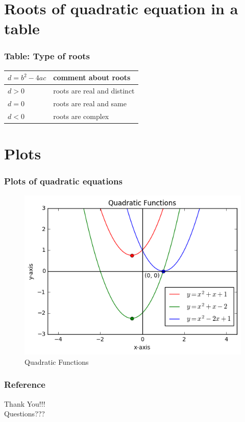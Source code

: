 \documentclass{beamer}
\begin{document}
\section{Roots of quadratic equation in a table}

\begin{frame}
  \frametitle{Table: Type of roots}\label{table-type-of-roots}
  \begin{center}
    \begin{tabular}{|l|l|}
      \hline
      $d = b^2-4ac$ & comment about roots\\
      \hline \hline
      $d>0$ & roots are real and distinct\\
      \hline
      $d = 0$ & roots are real and same\\
      \hline
      $d<0$ & roots are complex\\
      \hline
    \end{tabular}
  \end{center}
\end{frame}

\section{Plots}

\begin{frame}
  \frametitle{Plots of quadratic equations}
    \begin{figure}
    \centering
    \includegraphics[scale=0.5]{quadraticplots.png}
    \caption{Quadratic Functions}
    \end{figure}
\end{frame}
 
\begin{frame}
  \frametitle{Reference}
    
    
\end{frame}

\begin{frame}
    \centering
  Thank You!!!\\
  \vspace{1cm}
  Questions???
\end{frame}
\end{document}
